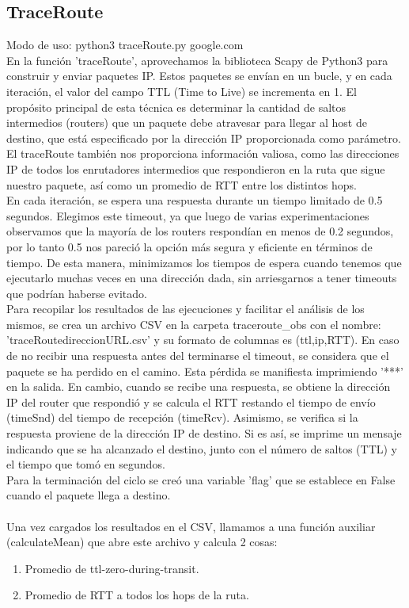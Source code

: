 \documentclass{article}
\begin{document}
    \subsection{TraceRoute}
        Modo de uso: python3 traceRoute.py google.com
        \\
        En la función 'traceRoute', aprovechamos la biblioteca Scapy de Python3 para construir y enviar paquetes IP. Estos paquetes se envían en un bucle, y en cada iteración, el valor del campo TTL (Time to Live) se incrementa en 1. El propósito principal de esta técnica es determinar la cantidad de saltos intermedios (routers) que un paquete debe atravesar para llegar al host de destino, que está especificado por la dirección IP proporcionada como parámetro.\\
        El traceRoute también nos proporciona información valiosa, como las direcciones IP de todos los enrutadores intermedios que respondieron en la ruta que sigue nuestro paquete, así como un promedio de RTT entre los distintos hops. \\
        En cada iteración, se espera una respuesta durante un tiempo limitado de 0.5 segundos. Elegimos este timeout, ya que luego de varias experimentaciones observamos que la mayoría de los routers respondían en menos de 0.2  segundos, por lo tanto 0.5 nos pareció la opción más segura y eficiente en términos de tiempo. De esta manera, minimizamos los tiempos de espera cuando tenemos que ejecutarlo muchas veces en una dirección dada, sin arriesgarnos a tener timeouts que podrían haberse evitado.\\
        Para recopilar los resultados de las ejecuciones y facilitar el análisis de los mismos, se crea un archivo CSV en la carpeta traceroute\_obs con el nombre: 'traceRoutedireccionURL.csv' y su formato de columnas es (ttl,ip,RTT).
        En caso de no recibir una respuesta antes del terminarse el timeout, se considera que el paquete se ha perdido en el camino. Esta pérdida se manifiesta imprimiendo '***' en la salida.
        En cambio, cuando se recibe una respuesta, se obtiene la dirección IP del router que respondió y se calcula el RTT restando el tiempo de envío (timeSnd) del tiempo de recepción (timeRcv).
        Asimismo, se verifica si la respuesta proviene de la dirección IP de destino. Si es así, se imprime un mensaje indicando que se ha alcanzado el destino, junto con el número de saltos (TTL) y el tiempo que tomó en segundos. \\
        Para la terminación del ciclo se creó una variable 'flag' que se establece en False cuando el paquete llega a destino.\\
        \\
        Una vez cargados los resultados en el CSV, llamamos a una función auxiliar (calculateMean) que abre este archivo y calcula 2 cosas: 
         \begin{enumerate}[label=\Roman*]  
            \item Promedio de ttl-zero-during-transit.
            \item Promedio de RTT a todos los hops de la ruta. 
         \end{enumerate}  
     
\end{document}
